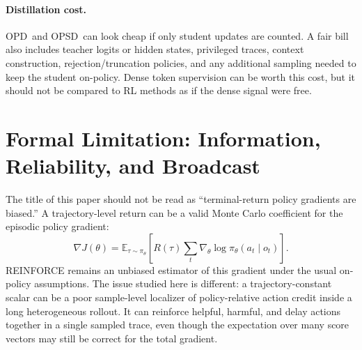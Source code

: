 \documentclass[11pt]{article}
\newcommand{\opd}{\textsc{OPD}}
\newcommand{\opsd}{\textsc{OPSD}}
\newcommand{\E}{\mathbb{E}}
\begin{document}
\paragraph{Distillation cost.}
\opd\ and \opsd\ can look cheap if only student updates are counted. A fair bill
also includes teacher logits or hidden states, privileged traces, context
construction, rejection/truncation policies, and any additional sampling needed
to keep the student on-policy. Dense token supervision can be worth this cost,
but it should not be compared to RL methods as if the dense signal were free.

\section{Formal Limitation: Information, Reliability, and Broadcast}

The title of this paper should not be read as ``terminal-return policy gradients
are biased.'' A trajectory-level return can be a valid Monte Carlo coefficient
for the episodic policy gradient:
\begin{equation}
\nabla J(\theta)
=
\E_{\tau\sim\pi_\theta}
\left[
R(\tau)
\sum_t \nabla_\theta \log \pi_\theta(a_t\mid o_t)
\right].
\end{equation}
REINFORCE remains an unbiased estimator of this gradient under the usual
on-policy assumptions. The issue studied here is different: a
trajectory-constant scalar can be a poor sample-level localizer of
policy-relative action credit inside a long heterogeneous rollout. It can
reinforce helpful, harmful, and delay actions together in a single sampled
trace, even though the expectation over many score vectors may still be
correct for the total gradient.
\end{document}

